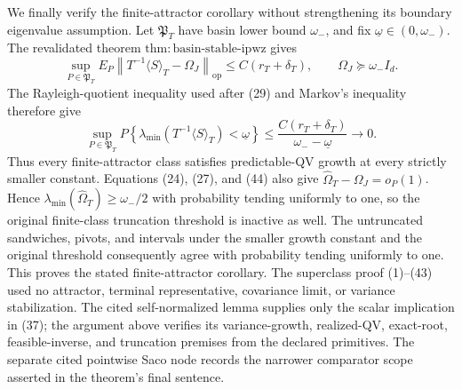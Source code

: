 We finally verify the finite-attractor corollary without strengthening its boundary eigenvalue assumption. Let \(\mathfrak P_T\) have basin lower bound \(\omega_-\), and fix \(\underline\omega\in(0,\omega_-)\). The revalidated theorem \(\mathrm{thm:basin\text{-}stable\text{-}ipwz}\) gives
\[
 \sup_{P\in\mathfrak P_T}E_P\left\|T^{-1}\langle S\rangle_T-\Omega_J\right\|_{\mathrm{op}}
 \le C(r_T+\delta_T),
 \qquad \Omega_J\succeq\omega_-I_d.
\tag{44}
\]
The Rayleigh-quotient inequality used after (29) and Markov's inequality therefore give
\[
 \sup_{P\in\mathfrak P_T}
 P\!\left\{\lambda_{\min}(T^{-1}\langle S\rangle_T)<\underline\omega\right\}
 \le\frac{C(r_T+\delta_T)}{\omega_--\underline\omega}
 \longrightarrow0.
\tag{45}
\]
Thus every finite-attractor class satisfies predictable-QV growth at every strictly smaller constant. Equations (24), (27), and (44) also give \(\widehat\Omega_T-\Omega_J=o_P(1)\). Hence \(\lambda_{\min}(\widehat\Omega_T)\ge\omega_-/2\) with probability tending uniformly to one, so the original finite-class truncation threshold is inactive as well. The untruncated sandwiches, pivots, and intervals under the smaller growth constant and the original threshold consequently agree with probability tending uniformly to one. This proves the stated finite-attractor corollary. The superclass proof (1)--(43) used no attractor, terminal representative, covariance limit, or variance stabilization. The cited self-normalized lemma supplies only the scalar implication in (37); the argument above verifies its variance-growth, realized-QV, exact-root, feasible-inverse, and truncation premises from the declared primitives. The separate cited pointwise Saco node records the narrower comparator scope asserted in the theorem's final sentence.

